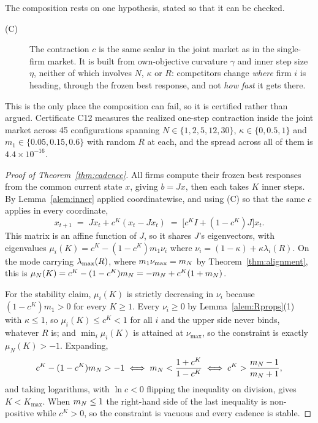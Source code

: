 The composition rests on one hypothesis, stated so that it can be checked.

\begin{description}
\item[(C)] The contraction $c$ is the same scalar in the joint market as in the single-firm market. It is built from own-objective curvature $\gamma$ and inner step size $\eta$, neither of which involves $N$, $\kappa$ or $R$: competitors change \emph{where} firm $i$ is heading, through the frozen best response, and not \emph{how fast} it gets there.
\end{description}

This is the only place the composition can fail, so it is certified rather than argued. Certificate C12 measures the realized one-step contraction inside the joint market across 45 configurations spanning $N \in \{1,2,5,12,30\}$, $\kappa \in \{0,0.5,1\}$ and $m_1 \in \{0.05,0.15,0.6\}$ with random $R$ at each, and the spread across all of them is $4.4\times 10^{-16}$.

\begin{proof}[Proof of Theorem~\ref{thm:cadence}]
All firms compute their frozen best responses from the common current state $x$, giving $b = Jx$, then each takes $K$ inner steps. By Lemma~\ref{alem:inner} applied coordinatewise, and using (C) so that the same $c$ applies in every coordinate,
\[
  x_{t+1} \;=\; Jx_t + c^K(x_t - Jx_t) \;=\; \big[c^K I + (1-c^K)J\big]x_t .
\]
This matrix is an affine function of $J$, so it shares $J$'s eigenvectors, with eigenvalues $\mu_i(K) = c^K - (1-c^K)m_1\nu_i$ where $\nu_i = (1-\kappa)+\kappa\lambda_i(R)$. On the mode carrying $\lambda_{\max}(R)$, where $m_1\nu_{\max} = m_N$ by Theorem~\ref{thm:alignment}, this is $\mu_N(K) = c^K - (1-c^K)m_N = -m_N + c^K(1+m_N)$.

For the stability claim, $\mu_i(K)$ is strictly decreasing in $\nu_i$ because $(1-c^K)m_1 > 0$ for every $K \geq 1$. Every $\nu_i \geq 0$ by Lemma~\ref{alem:Rprops}(1) with $\kappa \leq 1$, so $\mu_i(K) \leq c^K < 1$ for all $i$ and the upper side never binds, whatever $R$ is; and $\min_i \mu_i(K)$ is attained at $\nu_{\max}$, so the constraint is exactly $\mu_N(K) > -1$. Expanding,
\[
  c^K - (1-c^K)m_N > -1
  \iff m_N < \frac{1+c^K}{1-c^K}
  \iff c^K > \frac{m_N-1}{m_N+1},
\]
and taking logarithms, with $\ln c < 0$ flipping the inequality on division, gives $K < K_{\max}$. When $m_N \leq 1$ the right-hand side of the last inequality is non-positive while $c^K > 0$, so the constraint is vacuous and every cadence is stable.
\end{proof}


